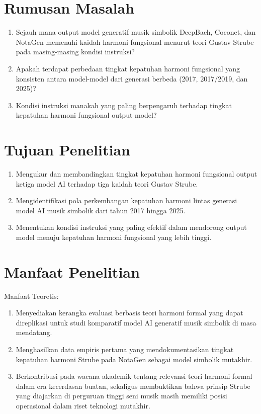 \section{Rumusan Masalah}

\begin{enumerate}
    \item Sejauh mana output model generatif musik simbolik DeepBach, Coconet, dan NotaGen memenuhi kaidah harmoni fungsional menurut teori Gustav Strube pada masing-masing kondisi instruksi?
    \item Apakah terdapat perbedaan tingkat kepatuhan harmoni fungsional yang konsisten antara model-model dari generasi berbeda (2017, 2017/2019, dan 2025)?
    \item Kondisi instruksi manakah yang paling berpengaruh terhadap tingkat kepatuhan harmoni fungsional output model?
\end{enumerate}

\section{Tujuan Penelitian}

\begin{enumerate}
    \item Mengukur dan membandingkan tingkat kepatuhan harmoni fungsional output ketiga model AI terhadap tiga kaidah teori Gustav Strube.
    \item Mengidentifikasi pola perkembangan kepatuhan harmoni lintas generasi model AI musik simbolik dari tahun 2017 hingga 2025.
    \item Menentukan kondisi instruksi yang paling efektif dalam mendorong output model menuju kepatuhan harmoni fungsional yang lebih tinggi.
\end{enumerate}

\section{Manfaat Penelitian}

Manfaat Teoretis:
\begin{enumerate}
    \item Menyediakan kerangka evaluasi berbasis teori harmoni formal yang dapat direplikasi untuk studi komparatif model AI generatif musik simbolik di masa mendatang.
    \item Menghasilkan data empiris pertama yang mendokumentasikan tingkat kepatuhan harmoni Strube pada NotaGen \parencite{wang2025} sebagai model simbolik mutakhir.
    \item Berkontribusi pada wacana akademik tentang relevansi teori harmoni formal dalam era kecerdasan buatan, sekaligus membuktikan bahwa prinsip Strube yang diajarkan di perguruan tinggi seni musik masih memiliki posisi operasional dalam riset teknologi mutakhir.
\end{enumerate}

